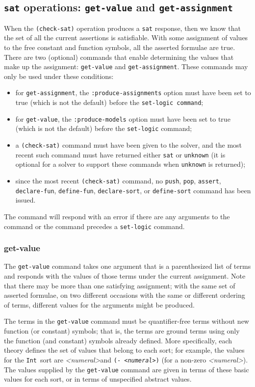 \documentclass[12pt,oneside]{report}
\newcommand{\numeral}{{\it <numeral>}}
\newcommand{\Int}{{\tt Int}}
\newcommand{\nospace}{\setlength{\itemsep}{0in}\setlength{\parsep}{0in}\setlength{\parskip}{0in}\setlength{\topsep}{0in}}
\begin{document}
\subsection{{\tt sat} operations: {\tt get-value} and {\tt get-assignment}}
\label{sat-commands}
When the {\tt (check-sat)} operation produces a {\tt sat} response,
then we know that the set of all the current assertions is satisfiable.
With some assignment of values to the free constant and function symbols, all the asserted
formulae are true.  There are two (optional) commands that enable determining 
the values that make up the assignment: {\tt get-value} and {\tt get-assignment}.
These commands may only be used under these conditions:
\begin{itemize} \nospace
\item for {\tt get-assignment}, the {\tt :produce-assignments} option must have been set to true (which is not the default) before the
{\tt set-logic command};
\item for {\tt get-value}, the {\tt :produce-models} option must have been set to true (which is not the default) before the 
{\tt set-logic} command;
\item a {\tt (check-sat)} command must have been given to the solver, and the most
recent such command must have returned either {\tt sat} or {\tt unknown} (it is optional for
a solver to support these commands when {\tt unknown} is returned);
\item since the most recent {\tt (check-sat)} command, no {\tt push}, {\tt pop},
{\tt assert}, {\tt declare-fun}, {\tt define-fun}, {\tt declare-sort}, or {\tt define-sort}
command has been issued.
\end{itemize}

The command will respond with an error if there are any arguments to the command or the command precedes a {\tt set-logic} command.

\subsubsection{get-value}
The {\tt get-value} command takes one argument that is a parenthesized list of terms and responds with the
values of those terms under the current assignment.  Note that there may
be more than one satisfying assignment; with the same set of asserted formulae,
on two different occasions with the same or different ordering of terms, different values for the arguments might be produced.

The terms in the {\tt get-value} command must be quantifier-free terms without new function (or constant) symbols;
that is, the terms are ground terms using only the function (and constant) symbols
already defined. More specifically, each theory defines the set of values that belong to 
each sort; for example, the values for the \Int~sort are \numeral and {\tt (- \numeral)} 
(for a non-zero \numeral). The values supplied by the {\tt get-value} command are given in terms of
these basic values for each sort, or in terms of unspecified abstract values.
\end{document}
